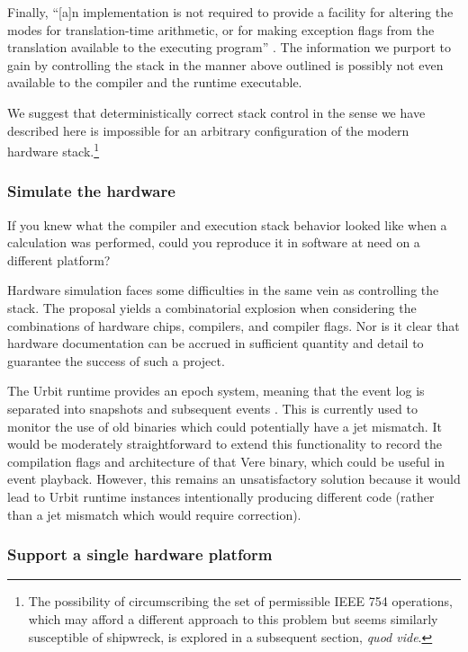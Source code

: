 \documentclass[twoside]{article}
\begin{document}
Finally, “[a]n implementation is not required to provide a facility for altering the modes for translation-time arithmetic, or for making exception flags from the translation available to the executing program” \citep[p.~200]{Jones2008}.  The information we purport to gain by controlling the stack in the manner above outlined is possibly not even available to the compiler and the runtime executable.

We suggest that deterministically correct stack control in the sense we have described here is impossible for an arbitrary configuration of the modern hardware stack.\footnote{The possibility of circumscribing the set of permissible IEEE 754 operations, which may afford a different approach to this problem but seems similarly susceptible of shipwreck, is explored in a subsequent section, \emph{quod vide}.}

\subsubsection{Simulate the hardware}

If you knew what the compiler and execution stack behavior looked like when a calculation was performed, could you reproduce it in software at need on a different platform?

Hardware simulation faces some difficulties in the same vein as controlling the stack.  The proposal yields a combinatorial explosion when considering the combinations of hardware chips, compilers, and compiler flags.  Nor is it clear that hardware documentation can be accrued in sufficient quantity and detail to guarantee the success of such a project.

The Urbit runtime provides an epoch system, meaning that the event log is separated into snapshots and subsequent events \citep{UrbitEpoch}.  This is currently used to monitor the use of old binaries which could potentially have a jet mismatch.  It would be moderately straightforward to extend this functionality to record the compilation flags and architecture of that Vere binary, which could be useful in event playback.  However, this remains an unsatisfactory solution because it would lead to Urbit runtime instances intentionally producing different code (rather than a jet mismatch which would require correction).

\subsubsection{Support a single hardware platform}
\end{document}

